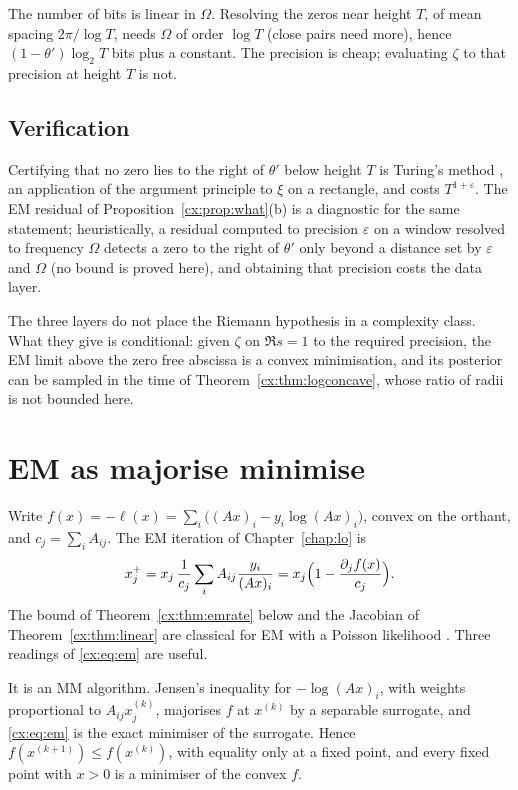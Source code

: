 The number of bits is linear in $\Omega$. Resolving the zeros near height $T$, of mean spacing $2\pi/\log T$, needs $\Omega$ of order $\log T$ (close pairs need more), hence $(1-\theta')\log_2T$ bits plus a constant. The precision is cheap; evaluating $\zeta$ to that precision at height $T$ is not.

\subsection{Verification}

Certifying that no zero lies to the right of $\theta'$ below height $T$ is Turing's method \cite{Turing53}, an application of the argument principle to $\xi$ on a rectangle, and costs $T^{1+\varepsilon}$. The EM residual of Proposition~\ref{cx:prop:what}(b) is a diagnostic for the same statement; heuristically, a residual computed to precision $\varepsilon$ on a window resolved to frequency $\Omega$ detects a zero to the right of $\theta'$ only beyond a distance set by $\varepsilon$ and $\Omega$ (no bound is proved here), and obtaining that precision costs the data layer.

\begin{remark}
The three layers do not place the Riemann hypothesis in a complexity class. What they give is conditional: given $\zeta$ on $\Re s=1$ to the required precision, the EM limit above the zero free abscissa is a convex minimisation, and its posterior can be sampled in the time of Theorem~\ref{cx:thm:logconcave}, whose ratio of radii is not bounded here.
\end{remark}

\section{EM as majorise minimise}\label{cx:sec:em}

Write $f(x)=-\ell(x)=\sum_i\bigl((Ax)_i-y_i\log(Ax)_i\bigr)$, convex on the orthant, and $c_j=\sum_iA_{ij}$. The EM iteration of Chapter~\ref{chap:lo} is
\begin{equation}\label{cx:eq:em}
x_j^{+}=x_j\,\frac{1}{c_j}\sum_iA_{ij}\frac{y_i}{(Ax)_i}=x_j\Bigl(1-\frac{\partial_jf(x)}{c_j}\Bigr).
\end{equation}
The bound of Theorem~\ref{cx:thm:emrate} below and the Jacobian of Theorem~\ref{cx:thm:linear} are classical for EM with a Poisson likelihood \cite{VardiLee93,CT84}. Three readings of \eqref{cx:eq:em} are useful.

It is an MM algorithm. Jensen's inequality for $-\log(Ax)_i$, with weights proportional to $A_{ij}x_j^{(k)}$, majorises $f$ at $x^{(k)}$ by a separable surrogate, and \eqref{cx:eq:em} is the exact minimiser of the surrogate. Hence $f(x^{(k+1)})\le f(x^{(k)})$, with equality only at a fixed point, and every fixed point with $x>0$ is a minimiser of the convex $f$.

